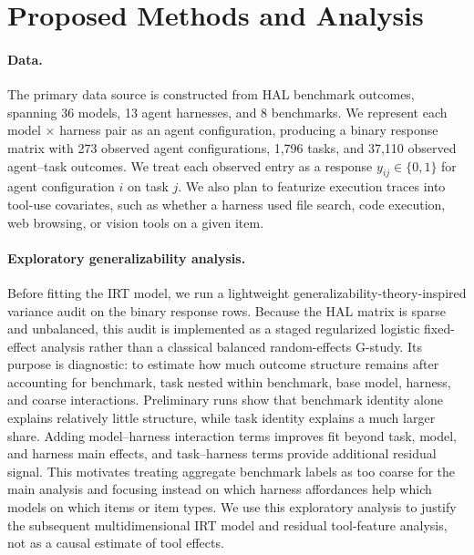 \documentclass{article}
\begin{document}
\section{Proposed Methods and Analysis}

\paragraph{Data.}
The primary data source is constructed from HAL benchmark outcomes, spanning 36 models, 13 agent harnesses, and 8 benchmarks. We represent each model $\times$ harness pair as an agent configuration, producing a binary response matrix with 273 observed agent configurations, 1,796 tasks, and 37,110 observed agent--task outcomes. We treat each observed entry as a response $y_{ij} \in \{0,1\}$ for agent configuration $i$ on task $j$. We also plan to featurize execution traces into tool-use covariates, such as whether a harness used file search, code execution, web browsing, or vision tools on a given item.

\paragraph{Exploratory generalizability analysis.}
Before fitting the IRT model, we run a lightweight generalizability-theory-inspired variance audit on the binary response rows. Because the HAL matrix is sparse and unbalanced, this audit is implemented as a staged regularized logistic fixed-effect analysis rather than a classical balanced random-effects G-study. Its purpose is diagnostic: to estimate how much outcome structure remains after accounting for benchmark, task nested within benchmark, base model, harness, and coarse interactions. Preliminary runs show that benchmark identity alone explains relatively little structure, while task identity explains a much larger share. Adding model--harness interaction terms improves fit beyond task, model, and harness main effects, and task--harness terms provide additional residual signal. This motivates treating aggregate benchmark labels as too coarse for the main analysis and focusing instead on which harness affordances help which models on which items or item types. We use this exploratory analysis to justify the subsequent multidimensional IRT model and residual tool-feature analysis, not as a causal estimate of tool effects.
\end{document}
